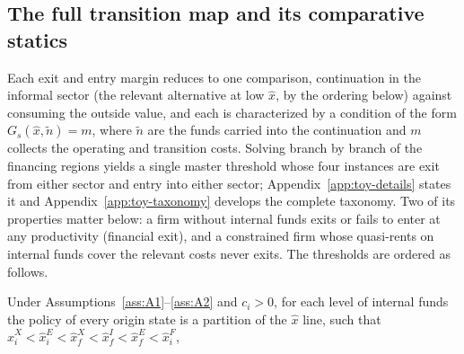 \documentclass[12pt]{article}
\begin{document}
\subsection{The full transition map and its comparative statics}
\label{sec:toy-map}

Each exit and entry margin reduces to one comparison, continuation in the informal sector (the relevant alternative at low $\hat{x}$, by the ordering below) against consuming the outside value, and each is characterized by a condition of the form $G_s(\hat{x}, \tilde{n}) = m$, where $\tilde{n}$ are the funds carried into the continuation and $m$ collects the operating and transition costs. Solving branch by branch of the financing regions yields a single master threshold whose four instances are exit from either sector and entry into either sector; Appendix~\ref{app:toy-details} states it and Appendix~\ref{app:toy-taxonomy} develops the complete taxonomy. Two of its properties matter below: a firm without internal funds exits or fails to enter at any productivity (financial exit), and a constrained firm whose quasi-rents on internal funds cover the relevant costs never exits. The thresholds are ordered as follows.
 
\begin{proposition}
\label{prop:ordering}
Under Assumptions~\ref{ass:A1}--\ref{ass:A2} and
$c_{i}>0$, for each level of internal funds the policy of every origin state is a partition of the $\hat x$ line, such that $ \hat x_i^X < \hat x_i^E < \hat x_f^X < \hat x_f^I < \hat x_f^E < \hat x_i^F $,

\begin{center}
\end{center}
\end{proposition}
 
\end{document}
